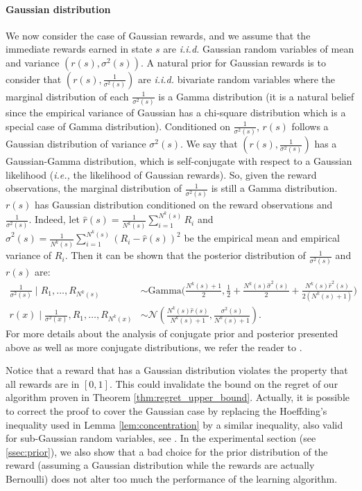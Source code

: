 \begin{subappendices}
\paragraph{Gaussian distribution}
We now consider the case of Gaussian rewards, and we assume that the immediate rewards earned in state $s$ are \emph{i.i.d.} Gaussian random variables of mean and variance $(r(s), \sigma^2(s))$. 
A natural prior for Gaussian rewards is to consider that $(r(s), \frac1{\sigma^2(s)})$ are \emph{i.i.d.} bivariate random variables where the marginal distribution of each $\frac{1}{\sigma^2(s)}$ is a Gamma distribution (it is a natural belief since the empirical variance of Gaussian has a chi-square distribution which is a special case of Gamma distribution). 
Conditioned on $\frac1{\sigma^2(s)}$, $r(s)$ follows a Gaussian distribution of variance $\sigma^2(s)$. 
We say that $(r(s), \frac1{\sigma^2(s)})$ has a Gaussian-Gamma distribution, which is self-conjugate with respect to a Gaussian likelihood (\emph{i.e.,} the likelihood of Gaussian rewards). 
So, given the reward observations, the marginal distribution of $\frac{1}{\sigma^2(s)}$ is still a Gamma distribution. 
$r(s)$ has Gaussian distribution conditioned on the reward observations and $\frac1{\sigma^2(s)}$. 
Indeed, let $\hat{r}(s)=\frac{1}{N^{k}(s)}\sum_{i=1}^{N^{k}(s)}R_i$ and $\hat{\sigma}^2(s)=\frac{1}{N^{k}(s)}\sum_{i=1}^{N^{k}(s)}\left(R_i-\hat{r}(s)\right)^2$ be the empirical mean and empirical variance of $R_i$. Then it can be shown that the posterior distribution of $\frac{1}{\sigma^2(s)}$ and $r(s)$ are:
\begin{align*}
    \frac{1}{\sigma^2(s)}\mid R_1,\dots,R_{N^{k}(s)}&{\sim} 
    \mathrm{Gamma}\bigg(\frac{N^{k}(s){+}1}{2}, \frac{1}{2}{+}\frac{N^{k}(s)\hat{\sigma}^2(s)}{2} {+}\frac{N^{k}(s)\hat{r}^2(s)}{2(N^{k}(s){+}1)}\bigg)\\
    r(x)\mid \frac1{\sigma^2(x)}, R_1,\dots,R_{N^{k}(x)}&{\sim} \mathcal{N}\left(\frac{N^{k}(s)\hat{r}(s)}{N^{k}(s)+1}, \frac{\sigma^2(s)}{N^{k}(s)+1}\right).
\end{align*}
For more details about the analysis of conjugate prior and posterior presented above as well as more conjugate distributions, we refer the reader to \cite{fink1997compendium,murphy2007conjugate}.

Notice that a reward that has a Gaussian distribution violates the property that all rewards are in $[0,1]$.
This could invalidate the bound on the regret of our algorithm proven in Theorem \ref{thm:regret_upper_bound}. 
Actually, it is possible to correct the proof to cover the Gaussian case by replacing the Hoeffding's inequality used in Lemma \ref{lem:concentration} by a similar inequality, also valid for sub-Gaussian random variables, see \cite{vershynin2018high}. 
In the experimental section (see \ref{ssec:prior}), we also show that a bad choice for the prior distribution of the reward (assuming a Gaussian distribution while the rewards are actually Bernoulli) does not alter too much the performance of the learning algorithm. 


\end{subappendices}
